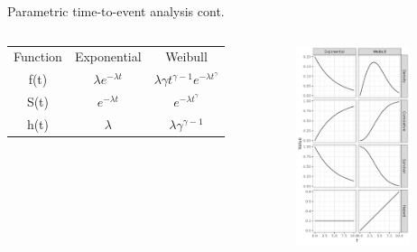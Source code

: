 \documentclass[
  ignorenonframetext,
]{beamer}
\begin{document}
\begin{frame}{Parametric time-to-event analysis cont.}
\label{parametric-time-to-event-analysis-cont.}
\begin{columns}[T]
\begin{column}{0.7\textwidth}
\begin{table}
    \centering
    \begin{tabular}{ccc}
        Function & Exponential & Weibull \\
        f(t) & \(\lambda e^{-\lambda t}\) &
\(\lambda\gamma t^{\gamma-1}e^{-\lambda t^{\gamma}}\) \\
        S(t) & \(e^{-\lambda t}\) & \(e^{-\lambda t^\gamma}\) \\
        h(t) & \(\lambda\) & \(\lambda \gamma ^{\gamma - 1}\) \\
    \end{tabular}
\end{table}
\end{column}

\begin{column}{0.3\textwidth}
\includegraphics[width=\textwidth,height=2.29167in]{figures/weiExpFig.png}
\end{column}
\end{columns}
\end{frame}
\end{document}
